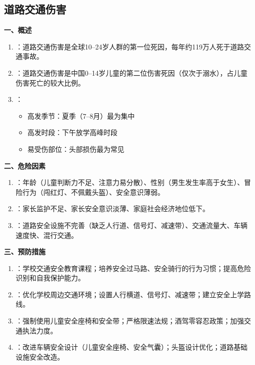 \subsection{道路交通伤害}

\begin{keybox}
\textbf{一、概述}
\begin{enumerate}[leftmargin=*]
    \item {}：道路交通伤害是全球10--24岁人群的第一位死因，每年约119万人死于道路交通事故。
    \item {}：道路交通伤害是中国0--14岁儿童的第二位伤害死因（仅次于溺水），占儿童伤害死亡的较大比例。
    \item {}：
    \begin{itemize}
        \item 高发季节：夏季（7--8月）最为集中
        \item 高发时段：下午放学高峰时段
        \item 易受伤部位：头部损伤最为常见
    \end{itemize}
\end{enumerate}

\textbf{二、危险因素}
\begin{enumerate}[leftmargin=*]
    \item {}：年龄（儿童判断力不足、注意力易分散）、性别（男生发生率高于女生）、冒险行为（闯红灯、不佩戴头盔）、安全意识薄弱。
    \item {}：家长监护不足、家长安全意识淡薄、家庭社会经济地位低下。
    \item {}：道路安全设施不完善（缺乏人行道、信号灯、减速带）、交通流量大、车辆速度快、混行交通。
\end{enumerate}

\textbf{三、预防措施}
\begin{enumerate}[leftmargin=*]
    \item {}：学校交通安全教育课程；培养安全过马路、安全骑行的行为习惯；提高危险识别和自我保护能力。
    \item {}：优化学校周边交通环境；设置人行横道、信号灯、减速带；建立安全上学路线。
    \item {}：强制使用儿童安全座椅和安全带；严格限速法规；酒驾零容忍政策；加强交通执法力度。
    \item {}：改进车辆安全设计（儿童安全座椅、安全气囊）；头盔设计优化；道路基础设施安全改造。
\end{enumerate}
\end{keybox}

